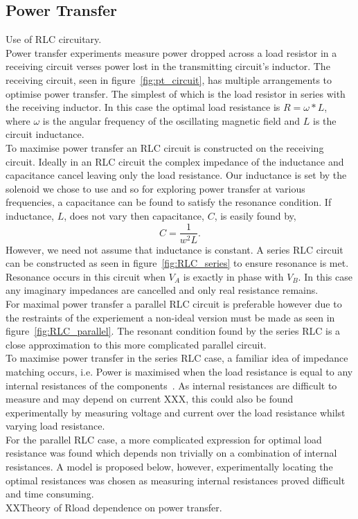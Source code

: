 \documentclass[11pt]{iopart}
\begin{document}
\subsection{Power Transfer}
Use of RLC circuitary.\\
Power transfer experiments measure power dropped across a load
resistor in a receiving circuit verses power lost in the transmitting
circuit's inductor. The receiving circuit, seen in
figure~\ref{fig:pt_circuit}, has multiple arrangements to optimise
power transfer. The simplest of which is the load resistor in series
with the receiving inductor. In this case the optimal load resistance
is $R = \omega*L$, where $\omega$ is the angular frequency of the
oscillating magnetic field and $L$ is the circuit inductance.\\ To
maximise power transfer an RLC circuit is constructed on the receiving
circuit. Ideally in an RLC circuit the complex impedance of the
inductance and capacitance cancel leaving only the load
resistance. Our inductance is set by the solenoid we chose to use and
so for exploring power transfer at various frequencies, a capacitance
can be found to satisfy the resonance condition. If inductance, $L$,
does not vary then capacitance, $C$, is easily found by,
\begin{equation}
  C = \frac{1}{w^2L}.
\end{equation}
However, we need not assume that inductance is constant. A series RLC
circuit can be constructed as seen in figure~\ref{fig:RLC_series} to
ensure resonance is met. Resonance occurs in this circuit when $V_A$
is exactly in phase with $V_B$. In this case any imaginary impedances
are cancelled and only real resistance remains. \\ For maximal power
transfer a parallel RLC circuit is preferable however due to the
restraints of the experiement a non-ideal version must be made as seen
in figure~\ref{fig:RLC_parallel}. The resonant condition found by the
series RLC is a close approximation to this more complicated parallel
circuit. \\
To maximise power transfer in the series RLC case, a familiar idea of
impedance matching occurs, i.e. Power is maximised when the load
resistance is equal to any internal resistances of the
components~\cite{XXX}. As internal resistances are difficult to
measure and may depend on current XXX, this could also be found
experimentally by measuring voltage and current over the load
resistance whilst varying load resistance. \\ For the parallel RLC
case, a more complicated expression for optimal load resistance was
found which depends non trivially on a combination of internal
resistances. A model is proposed below, however, experimentally
locating the optimal resistances was chosen as measuring internal
resistances proved difficult and time consuming.\\
XXTheory of Rload dependence on power transfer. \\
\end{document}

